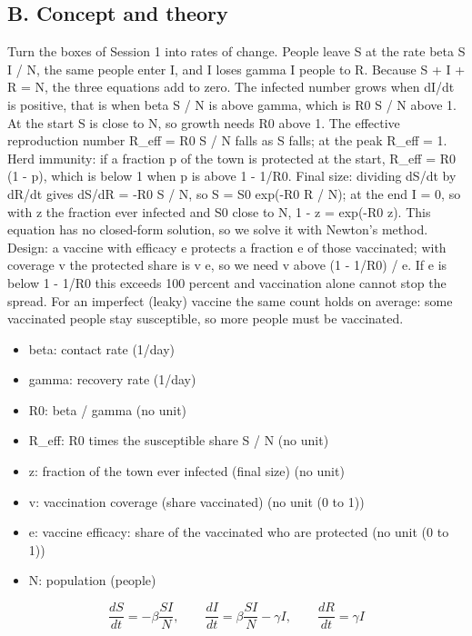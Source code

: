 \documentclass[11pt,a4paper]{article}
\begin{document}
\subsection*{B. Concept and theory}
Turn the boxes of Session 1 into rates of change. People leave S at the rate beta S I / N, the same people enter I, and I loses gamma I people to R. Because S + I + R = N, the three equations add to zero. The infected number grows when dI/dt is positive, that is when beta S / N is above gamma, which is R0 S / N above 1. At the start S is close to N, so growth needs R0 above 1. The effective reproduction number R\_eff = R0 S / N falls as S falls; at the peak R\_eff = 1. Herd immunity: if a fraction p of the town is protected at the start, R\_eff = R0 (1 - p), which is below 1 when p is above 1 - 1/R0. Final size: dividing dS/dt by dR/dt gives dS/dR = -R0 S / N, so S = S0 exp(-R0 R / N); at the end I = 0, so with z the fraction ever infected and S0 close to N, 1 - z = exp(-R0 z). This equation has no closed-form solution, so we solve it with Newton's method. Design: a vaccine with efficacy e protects a fraction e of those vaccinated; with coverage v the protected share is v e, so we need v above (1 - 1/R0) / e. If e is below 1 - 1/R0 this exceeds 100 percent and vaccination alone cannot stop the spread. For an imperfect (leaky) vaccine the same count holds on average: some vaccinated people stay susceptible, so more people must be vaccinated.

\begin{itemize}[nosep]
\item beta: contact rate (1/day)
\item gamma: recovery rate (1/day)
\item R0: beta / gamma (no unit)
\item R\_eff: R0 times the susceptible share S / N (no unit)
\item z: fraction of the town ever infected (final size) (no unit)
\item v: vaccination coverage (share vaccinated) (no unit (0 to 1))
\item e: vaccine efficacy: share of the vaccinated who are protected (no unit (0 to 1))
\item N: population (people)
\end{itemize}

\begin{equation*}
\dfrac{dS}{dt}=-\beta\dfrac{S I}{N},\qquad \dfrac{dI}{dt}=\beta\dfrac{S I}{N}-\gamma I,\qquad \dfrac{dR}{dt}=\gamma I
\end{equation*}
\end{document}
